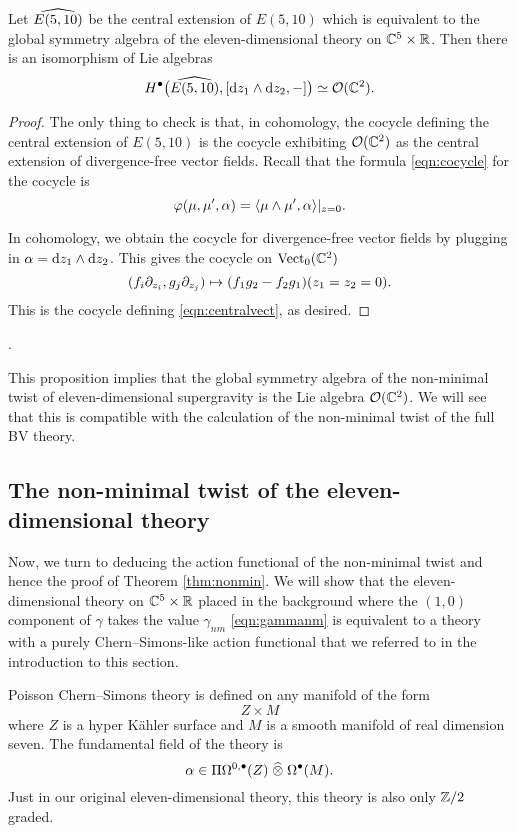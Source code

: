 \begin{prop}
\label{prop:ham}
Let $\Hat{E(5,10)}$ be the central extension of $E(5,10)$ which is equivalent to the global symmetry algebra of the eleven-dimensional theory on $\CC^5 \times \RR$. 
Then there is an isomorphism of Lie algebras 
\[
H^\bu \big(\Hat{E(5,10)} , [\d z_1 \wedge \d z_2, -] \big) \simeq \cO(\CC^2) .
\]
\end{prop}
\begin{proof}
The only thing to check is that, in cohomology, the cocycle defining the central extension of $E(5,10)$ is the cocycle exhibiting $\cO(\CC^2)$ as the central extension of divergence-free vector fields. 
Recall that the formula \eqref{eqn:cocycle} for the cocycle is 
\[
\varphi(\mu, \mu', \alpha) = \<\mu \wedge \mu', \alpha\>|_{z=0}.
\]

In cohomology, we obtain the cocycle for divergence-free vector fields by plugging in $\alpha = \d z_1 \wedge \d z_2$. 
This gives the cocycle on $\Vect_0(\CC^2)$ 
\[
(f_i \del_{z_i}, g_j \del_{z_j}) \mapsto (f_1 g_2 - f_2 g_1)(z_1=z_2=0) .
\]
This is the cocycle defining \eqref{eqn:centralvect}, as desired. 
\end{proof}.

This proposition implies that the global symmetry algebra of the non-minimal twist of eleven-dimensional supergravity is the Lie algebra $\cO(\CC^2)$. 
We will see that this is compatible with the calculation of the non-minimal twist of the full BV theory. 

\subsection{The non-minimal twist of the eleven-dimensional theory}

Now, we turn to deducing the action functional of the non-minimal twist and hence the proof of Theorem \ref{thm:nonmin}. 
We will show that the eleven-dimensional theory on $\CC^5 \times \RR$ placed in the background where the $(1,0)$ component of $\gamma$ takes the value $\gamma_{nm}$ \eqref{eqn:gammanm} is equivalent to a theory with a purely Chern--Simons-like action functional that we referred to in the introduction to this section. 

Poisson Chern--Simons theory is defined on any manifold of the form
\[
Z \times M
\]
where $Z$ is a hyper K\"ahler surface and $M$ is a smooth manifold of real dimension seven. 
The fundamental field of the theory is  
\[
\alpha \in \Pi \Omega^{0,\bu}(Z) \; \Hat{\otimes} \; \Omega^\bu(M)  .
\]
Just in our original eleven-dimensional theory, this theory is also only $\ZZ/2$ graded. 

